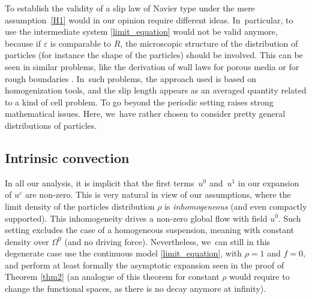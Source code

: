 \documentclass[JEP,XML,SOM,Unicode,NoEqCountersInSection,published]{cedram}
\theoremstyle{plain}
\theoremstyle{definition}
\let\eps\varepsilon
\begin{document}
To establish the validity of a slip law of Navier type under the mere assumption~\eqref{H1} would in our opinion require different ideas. In~particular, to use the intermediate system \eqref{limit_equation} would not be valid anymore, because if $\eps$ is comparable to $R$, the microscopic structure of the distribution of particles (for instance the shape of the particles) should be involved. This can be seen in similar problems, like the derivation of wall laws for porous media \cite{Mikelic1996} or for rough boundaries \cite{Mikelic2009,Basson2008}. In~such problems, the approach used is based on homogenization tools, and the slip length appears as an averaged quantity related to a kind of cell problem. To go beyond the periodic setting raises strong mathematical issues. Here, we~have rather chosen to consider pretty general distributions of particles.

\subsection{Intrinsic convection} \label{subsecintrinsic}
In all our analysis, it is implicit that the first terms~$u^0$ and~$u^1$ in our expansion of $u^\eps$ are non-zero. This is very natural in view of our assumptions, where the limit density of the particles distribution $\rho$ is {\em inhomogeneous} (and even compactly supported). This inhomogeneity drives a non-zero global flow with field $u^0$. Such setting excludes the case of a homogeneous suspension, meaning with constant density over
$\Omega^0$ (and no driving force). Nevertheless, we~can still in this degenerate case use the continuous model \eqref{limit_equation}, with $\rho=1$ and $f=0$, and perform at least formally the asymptotic expansion seen in the proof of Theorem \ref{thm2} (an analogue of this theorem for constant $\rho$ would require to change the functional spaces, as there is no decay anymore at infinity).
\end{document}
